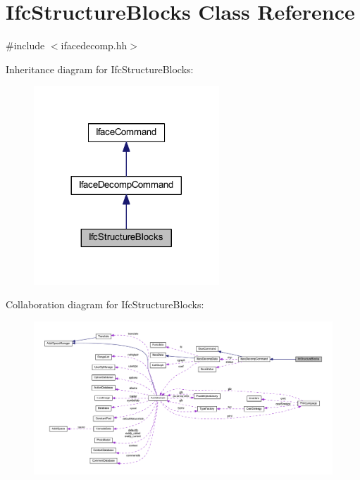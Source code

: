 \hypertarget{class_ifc_structure_blocks}{}\section{Ifc\+Structure\+Blocks Class Reference}
\label{class_ifc_structure_blocks}


{\ttfamily \#include $<$ifacedecomp.\+hh$>$}



Inheritance diagram for Ifc\+Structure\+Blocks\+:
\nopagebreak
\begin{figure}[H]
\begin{center}
\leavevmode
\includegraphics[width=197pt]{class_ifc_structure_blocks__inherit__graph}
\end{center}
\end{figure}


Collaboration diagram for Ifc\+Structure\+Blocks\+:
\nopagebreak
\begin{figure}[H]
\begin{center}
\leavevmode
\includegraphics[width=350pt]{class_ifc_structure_blocks__coll__graph}
\end{center}
\end{figure}

